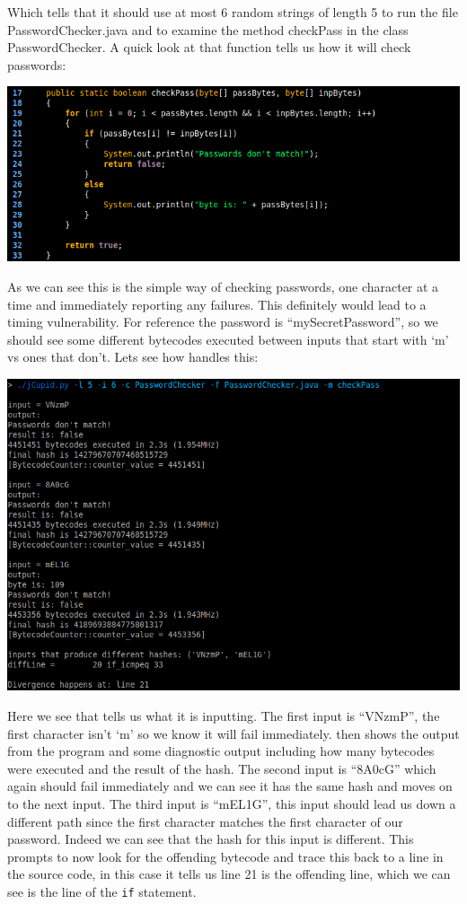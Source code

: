 Which tells \jcupid that it should use at most 6 random strings of length 5 to run the file PasswordChecker.java
and to examine the method checkPass in the class PasswordChecker. A quick look at that function tells us how
it will check passwords:

\begin{center}
  \includegraphics[width=\linewidth]{PasswordChecker}
\end{center}

As we can see this is the simple way of checking passwords, one character at a time and immediately reporting
any failures. This definitely would lead to a timing vulnerability. For reference the password is 
``mySecretPassword'', so we should see some different bytecodes executed between inputs that start with `m'
vs ones that don't. Lets see how \jcupid handles this:

\begin{center}
  \includegraphics[width=\linewidth]{jCupidRun1}
\end{center}

Here we see that \jcupid tells us what it is inputting. The first input is ``VNzmP'', the first character
isn't `m' so we know it will fail immediately. \jcupid then shows the output from the program and some
diagnostic output including how many bytecodes were executed and the result of the hash. The second input
is ``8A0cG'' which again should fail immediately and we can see it has the same hash and moves on to the
next input. The third input is ``mEL1G'', this input should lead us down a different path since the first
character matches the first character of our password. Indeed we can see that the hash for this input is
different. This prompts \jcupid to now look for the offending bytecode and trace this back to a line in 
the source code, in this case it tells us line 21 is the offending line, which we can see is the line of
the \texttt{if} statement.

